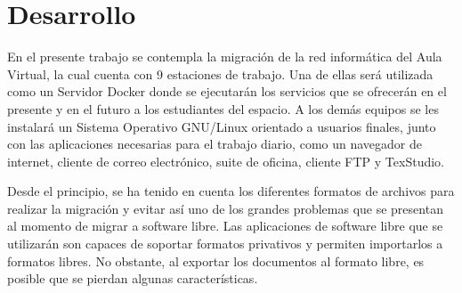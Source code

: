 \chapter{Desarrollo}\label{ch:desarrollo}
	
	En el presente trabajo se contempla la migración de la red informática del Aula Virtual, la cual cuenta con 9 estaciones de trabajo. Una de ellas será utilizada como un Servidor Docker donde se ejecutarán los servicios que se ofrecerán en el presente y en el futuro a los estudiantes del espacio. A los demás equipos se les instalará un Sistema Operativo GNU/Linux orientado a usuarios finales, junto con las aplicaciones necesarias para el trabajo diario, como un navegador de internet, cliente de correo electrónico, suite de oficina, cliente FTP y TexStudio.\par

Desde el principio, se ha tenido en cuenta los diferentes formatos de archivos para realizar la migración y evitar así uno de los grandes problemas que se presentan al momento de migrar a software libre. Las aplicaciones de software libre que se utilizarán son capaces de soportar formatos privativos y permiten importarlos a formatos libres. No obstante, al exportar los documentos al formato libre, es posible que se pierdan algunas características.